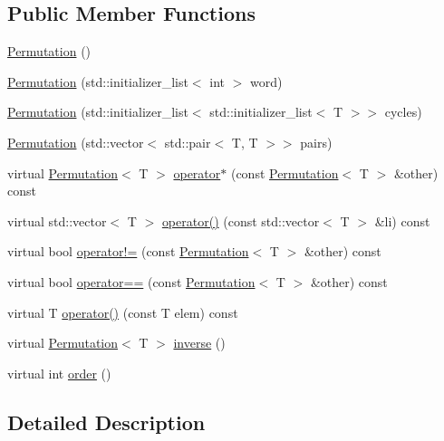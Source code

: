 \subsection*{Public Member Functions}
\begin{DoxyCompactItemize}
\item 
\hyperlink{class_alg_lib_1_1_permutation_ae72beae52a1669396d13441b72709683}{Permutation} ()
\item 
\hyperlink{class_alg_lib_1_1_permutation_a1b2028a9b4cc2f593ee8037ae25e4ec8}{Permutation} (std\+::initializer\+\_\+list$<$ int $>$ word)
\item 
\hyperlink{class_alg_lib_1_1_permutation_a31e05184954e85e206b1ca6dc4dfe25f}{Permutation} (std\+::initializer\+\_\+list$<$ std\+::initializer\+\_\+list$<$ T $>$$>$ cycles)
\item 
\hyperlink{class_alg_lib_1_1_permutation_a6cea586e990533bc9c5dc649f28ca2e2}{Permutation} (std\+::vector$<$ std\+::pair$<$ T, T $>$$>$ pairs)
\item 
virtual \hyperlink{class_alg_lib_1_1_permutation}{Permutation}$<$ T $>$ \hyperlink{class_alg_lib_1_1_permutation_a495faf3699aa7996f19829816498efdb}{operator$\ast$} (const \hyperlink{class_alg_lib_1_1_permutation}{Permutation}$<$ T $>$ \&other) const 
\item 
virtual std\+::vector$<$ T $>$ \hyperlink{class_alg_lib_1_1_permutation_a1f773aa53b671a8f5930f50daffae15c}{operator()} (const std\+::vector$<$ T $>$ \&li) const 
\item 
virtual bool \hyperlink{class_alg_lib_1_1_permutation_a195d7015d44c650db9b7fec897b165a0}{operator!=} (const \hyperlink{class_alg_lib_1_1_permutation}{Permutation}$<$ T $>$ \&other) const 
\item 
virtual bool \hyperlink{class_alg_lib_1_1_permutation_a07235b740895334671099e3b02b6168f}{operator==} (const \hyperlink{class_alg_lib_1_1_permutation}{Permutation}$<$ T $>$ \&other) const 
\item 
virtual T \hyperlink{class_alg_lib_1_1_permutation_a6ecb0760c9ed48542b4a93a8b842bb0b}{operator()} (const T elem) const 
\item 
virtual \hyperlink{class_alg_lib_1_1_permutation}{Permutation}$<$ T $>$ \hyperlink{class_alg_lib_1_1_permutation_ac5f361e8a5cab1dbb331341e9d3c76b0}{inverse} ()
\item 
virtual int \hyperlink{class_alg_lib_1_1_permutation_a0241c0e6e52419e08832620e607caeba}{order} ()
\end{DoxyCompactItemize}


\subsection{Detailed Description}
